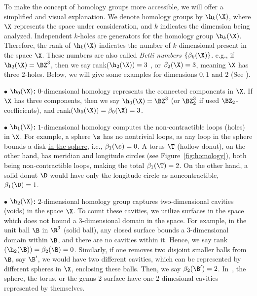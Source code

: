To make the concept of homology groups more accessible, we will offer a simplified and visual explanation. 
We denote homology groups by $ \h_k(\X) $, where $ \X $ represents the space under consideration, and $ k $ indicates the dimension being analyzed. Independent $k$-holes are generators for the homology group $\h_k(\X)$. Therefore, the rank of $ \h_k(\X) $ indicates the number of $ k $-dimensional  present in the space $ \X $. These numbers are also called {\em Betti numbers} $\{\beta_k(\X)\}$. e.g., if $\h_2(\X)=\BZ^3$, then we say rank($\h_2(\X))=3$ , or $\beta_2(\X)=3$, meaning $\X$ has three $2$-holes.  Below, we will give some examples for dimensions $0,1$ and $2$ (See ).




 
    
\noindent $\bullet$ \textbf{$\h_0(\X)$:} $0$-dimensional homology represents the connected components in $\X$. If $\X$ has three components, then we say $\h_0(\X)=\BZ^3$ (or $\BZ_2^3$ if used $\BZ_2$-coefficients), and rank$(\h_0(\X))=\beta_0(\X)=3$.
    

    \smallskip

    
\noindent $\bullet$ \textbf{$\h_1(\X)$:} $1$-dimensional homology computes the non-contractible loops (holes) in $\X$.
    For example, a sphere $\s$ has no nontrivial loops, as any loop in the sphere bounds a disk \underline{in the sphere}, i.e., $\beta_1(\s)=0$.
    A torus $\T$ (hollow donut), on the other hand, has meridian and longitude circles (see Figure~\ref{fig:homology}), both being non-contractible loops, making the total $\beta_1(\T)=2$. On the other hand, a solid donut $\D$ would have only the longitude circle as noncontractible, $\beta_1(\D)=1$.


    \smallskip
    
\noindent $\bullet$ \textbf{$\h_2(\X)$:} $2$-dimensional homology group captures two-dimensional cavities (voids) in the space $\X$. To count these cavities, we utilize surfaces in the space which does not bound a $3$-dimensional domain in the space. For example, in the unit ball $\B$ in $\R^3$ (solid ball), any closed surface bounds a 3-dimensional domain within $\B$, and there are no cavities within it. Hence, we say rank$(\h_2(\B))=\beta_2(\B)=0$. Similarly, if one removes two disjoint smaller balls from $\B$, say $\B'$, we would have two different cavities, which can be represented by different spheres in $\X$, enclosing these balls. Then, we say $\beta_2(\B')=2$. In~, the sphere, the torus, or the genus-$2$ surface have one $2$-dimesional cavities represented by themselves.
    
